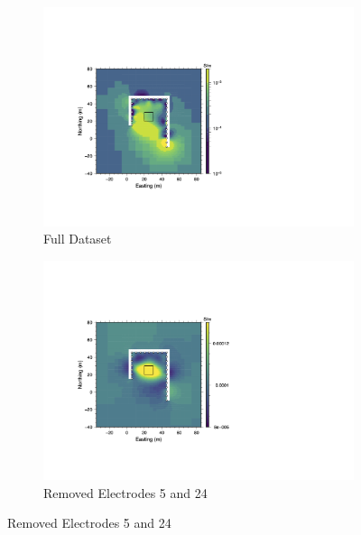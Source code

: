 \documentclass[final,authoryear,5p,times,twocolumn]{elsarticle}
\begin{document}
\begin{figure}[!ht]
   \centering

   \begin{subfigure}[b]{0.475\linewidth}
       \centering
       \includegraphics[trim=3.35cm 3.6cm 11.95cm 5.4cm, clip=true, width=\linewidth]{./Figures/Fig21a.png}
       \caption{Full Dataset}
       \label{fig:Synth_Horseshoe_BadElec_Full}
   \end{subfigure}
   \hfill
   \begin{subfigure}[b]{0.475\linewidth}
       \centering
       \includegraphics[trim=3.35cm 3.6cm 11.95cm 5.4cm, clip=true, width=\linewidth]{./Figures/Fig21b.png}
       \caption{Removed Electrodes 5 and 24}
       \label{fig:Synth_Horseshoe_BadElec_No5_24}
   \end{subfigure}


\end{figure}
\end{document}
